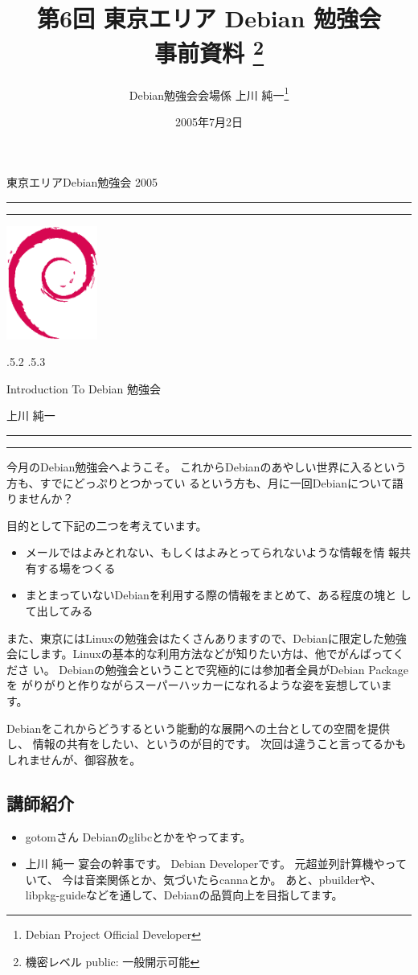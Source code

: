 \documentclass[mingoth]{jsarticle}
\makeatletter
\renewcommand{\section}{\@startsection{section}{1}{\z@}%
    {\Cvs \@plus.5\Cdp \@minus.2\Cdp}%
    {.5\Cvs \@plus.3\Cdp}%
    {\normalfont\Large\headfont\raggedright\centering}} %
\newcommand{\dancersection}[2]{%
\newpage
東京エリアDebian勉強会 2005
\hrule
\vspace{0.5mm}
\hrule
\hfill{}\includegraphics[width=3cm]{image200502/openlogo-nd.eps}\\
\vspace{-4cm}
\begin{center}
  \section{#1}
\end{center}
\hfill{}#2\hspace{3cm}\space\\
\hrule
\hrule
\vspace{1cm}
}
\makeatother
\begin{document}
\begin{titlepage}

\title{
 第6回 東京エリア Debian 勉強会\\事前資料
\footnote{機密レベル public: 一般開示可能}}
\date{2005年7月2日}
\author{Debian勉強会会場係 上川 純一\thanks{Debian Project Official Developer}} 
\maketitle

\end{titlepage}

\newpage
\tableofcontents

\dancersection{Introduction To Debian 勉強会}{上川 純一}

今月のDebian勉強会へようこそ。
これからDebianのあやしい世界に入るという方も、すでにどっぷりとつかってい
るという方も、月に一回Debianについて語りませんか？

目的として下記の二つを考えています。

\begin{itemize}
 \item メールではよみとれない、もしくはよみとってられないような情報を情
       報共有する場をつくる
 \item まとまっていないDebianを利用する際の情報をまとめて、ある程度の塊と
       して出してみる
\end{itemize}

また、東京にはLinuxの勉強会はたくさんありますので、Debianに限定した勉強
会にします。Linuxの基本的な利用方法などが知りたい方は、他でがんばってくださ
い。
Debianの勉強会ということで究極的には参加者全員がDebian Packageを
がりがりと作りながらスーパーハッカーになれるような姿を妄想しています。

Debianをこれからどうするという能動的な展開への土台としての空間を提供し、
情報の共有をしたい、というのが目的です。
次回は違うこと言ってるかもしれませんが、御容赦を。

\subsection{講師紹介}

\begin{itemize}
 \item{gotomさん} Debianのglibcとかをやってます。
 \item{上川 純一} 宴会の幹事です。
      Debian Developerです。
      元超並列計算機やっていて、
      今は音楽関係とか、気づいたらcannaとか。
      あと、pbuilderや、libpkg-guideなどを通して、Debianの品質向上を目指してます。
\end{itemize}
\end{document}
